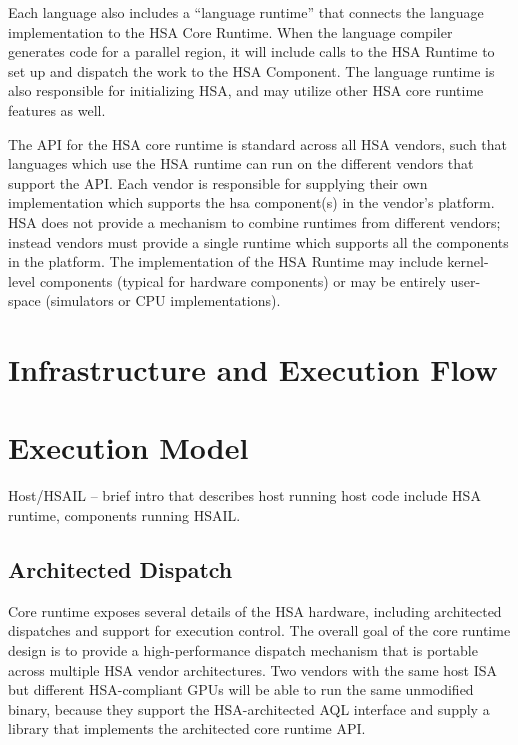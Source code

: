 \documentclass{book}
\newcommand{\diffblock}[1]{#1}
\begin{document}
Each language also includes a “language runtime” that connects the
language implementation to the HSA Core Runtime.   When the language
compiler generates code for a parallel region, it will include calls
to the HSA Runtime to set up and dispatch the work to the HSA
Component.   The language runtime is also responsible for
initializing HSA, and may utilize other HSA core runtime features as
well.

The API for the HSA core runtime is standard across all HSA vendors,
such that languages which use the HSA runtime can run on the
different vendors that support the API.  Each vendor is responsible
for supplying their own implementation which supports the hsa
component(s) in the vendor’s platform.   HSA does not provide a
mechanism to combine runtimes from different vendors; instead
vendors must provide a single runtime which supports all the
components in the platform.
The implementation of the HSA Runtime may include kernel-level
components (typical for hardware components) or may be entirely
user-space (simulators or CPU implementations).

\hypertarget{glue}{}\section{ Infrastructure and Execution
Flow}\label{glue}

\diffblock{
\hypertarget{executionmodel}{}\section{Execution
Model}\label{executionmodel}
}
Host/HSAIL – brief intro that describes host running host code
include HSA runtime, components running HSAIL.

\diffblock{\hypertarget{archdispatch}{}\subsection{Architected Dispatch}
\label{archdispatch}}
Core runtime exposes several details of the HSA hardware,
including architected dispatches and support for execution control.
The overall goal of the core runtime design is to provide a
high-\/performance dispatch mechanism that is portable across
multiple H\-S\-A vendor architectures. Two vendors with the same
host I\-S\-A but different H\-S\-A-\/compliant G\-P\-Us will be able
to run the same unmodified binary, because they support the
H\-S\-A-\/architected A\-Q\-L interface and supply a library
that implements the architected core runtime A\-P\-I.
\end{document}
